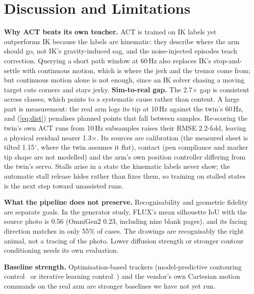 \documentclass[conference]{IEEEtran}
\begin{document}
\section{Discussion and Limitations}
\label{sec:disc}

\textbf{Why ACT beats its own teacher.} ACT is trained on IK labels yet outperforms IK because the labels are
kinematic: they describe where the arm should go, not IK's gravity-induced sag, and the noise-injected episodes
teach correction. Querying a short path window at 60\,Hz also replaces IK's stop-and-settle with continuous
motion, which is where the jerk and the tremor come from; but continuous motion alone is not enough, since an IK
solver chasing a moving target cuts corners and stays jerky.
\textbf{Sim-to-real gap.} The 2.7$\times$ gap is consistent across classes, which points to a systematic
cause rather than content. A large part is measurement: the real arm logs its tip at 10\,Hz against the twin's
60\,Hz, and (\ref{eq:dist}) penalises planned points that fall between samples. Re-scoring the twin's own ACT
runs from 10\,Hz subsamples raises their RMSE 2.2-fold, leaving a physical residual nearer 1.3$\times$. Its
sources are calibration (the measured sheet is tilted 1.15$^\circ$, where the twin assumes it flat), contact
(pen compliance and marker tip shape are not modelled) and the arm's own position controller differing from the twin's
servo. Stalls arise in a state the kinematic labels never show; the automatic stall release hides rather than
fixes them, so training on stalled states is the next step toward unassisted runs.

\textbf{What the pipeline does not preserve.} Recognisability and geometric fidelity are separate goals. In the
generator study, FLUX's mean silhouette IoU with the source photo is 0.56 (OmniGen2 0.23, including nine blank
pages), and its facing direction matches in only 55\% of cases. The drawings are recognisably the right animal,
not a tracing of the photo. Lower diffusion strength or stronger contour conditioning needs its own evaluation.

\textbf{Baseline strength.} Optimisation-based trackers (model-predictive contouring
control~\cite{lam2010mpcc} or iterative learning control~\cite{bristow2006ilc}) and the vendor's own Cartesian
motion commands on the real arm are stronger baselines we have not yet run.
\end{document}
